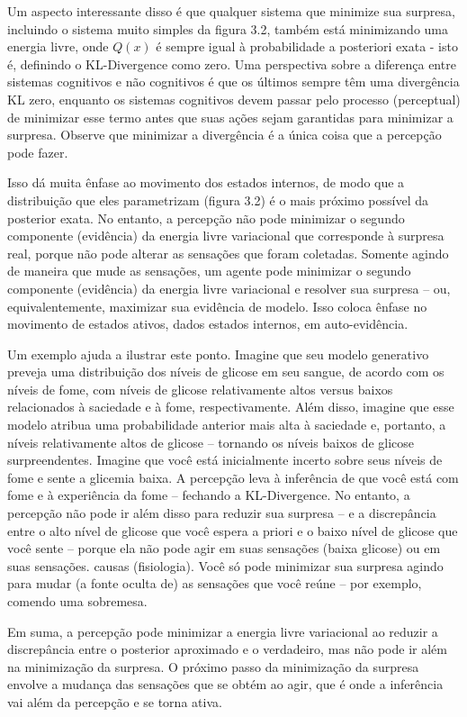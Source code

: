 \documentclass[
  12pt,
]{book}
\begin{document}
Um aspecto interessante disso é que qualquer sistema que minimize sua surpresa, incluindo o sistema muito simples da figura 3.2, também está minimizando uma energia livre, onde \(Q(x)\) é sempre igual à probabilidade a posteriori exata - isto é, definindo o KL-Divergence como zero. Uma perspectiva sobre a diferença entre sistemas cognitivos e não cognitivos é que os últimos sempre têm uma divergência KL zero, enquanto os sistemas cognitivos devem passar pelo processo (perceptual) de minimizar esse termo antes que suas ações sejam garantidas para minimizar a surpresa. Observe que minimizar a divergência é a única coisa que a percepção pode fazer.

Isso dá muita ênfase ao movimento dos estados internos, de modo que a distribuição que eles parametrizam (figura 3.2) é o mais próximo possível da posterior exata. No entanto, a percepção não pode minimizar o segundo componente (evidência) da energia livre variacional que corresponde à surpresa real, porque não pode alterar as sensações que foram coletadas. Somente agindo de maneira que mude as sensações, um agente pode minimizar o segundo componente (evidência) da energia livre variacional e resolver sua surpresa -- ou, equivalentemente, maximizar sua evidência de modelo. Isso coloca ênfase no movimento de estados ativos, dados estados internos, em auto-evidência.

Um exemplo ajuda a ilustrar este ponto. Imagine que seu modelo generativo preveja uma distribuição dos níveis de glicose em seu sangue, de acordo com os níveis de fome, com níveis de glicose relativamente altos versus baixos relacionados à saciedade e à fome, respectivamente. Além disso, imagine que esse modelo atribua uma probabilidade anterior mais alta à saciedade e, portanto, a níveis relativamente altos de glicose -- tornando os níveis baixos de glicose surpreendentes. Imagine que você está inicialmente incerto sobre seus níveis de fome e sente a glicemia baixa. A percepção leva à inferência de que você está com fome e à experiência da fome -- fechando a KL-Divergence. No entanto, a percepção não pode ir além disso para reduzir sua surpresa -- e a discrepância entre o alto nível de glicose que você espera a priori e o baixo nível de glicose que você sente -- porque ela não pode agir em suas sensações (baixa glicose) ou em suas sensações. causas (fisiologia). Você só pode minimizar sua surpresa agindo para mudar (a fonte oculta de) as sensações que você reúne -- por exemplo, comendo uma sobremesa.

Em suma, a percepção pode minimizar a energia livre variacional ao reduzir a discrepância entre o posterior aproximado e o verdadeiro, mas não pode ir além na minimização da surpresa. O próximo passo da minimização da surpresa envolve a mudança das sensações que se obtém ao agir, que é onde a inferência vai além da percepção e se torna ativa.
\end{document}
